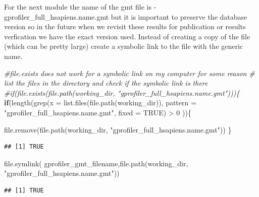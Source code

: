 \documentclass[
]{book}
\newenvironment{Shaded}{\begin{snugshade}}{\end{snugshade}}
\newcommand{\AttributeTok}[1]{\textcolor[rgb]{0.77,0.63,0.00}{#1}}
\newcommand{\CommentTok}[1]{\textcolor[rgb]{0.56,0.35,0.01}{\textit{#1}}}
\newcommand{\ConstantTok}[1]{\textcolor[rgb]{0.00,0.00,0.00}{#1}}
\newcommand{\ControlFlowTok}[1]{\textcolor[rgb]{0.13,0.29,0.53}{\textbf{#1}}}
\newcommand{\DecValTok}[1]{\textcolor[rgb]{0.00,0.00,0.81}{#1}}
\newcommand{\FunctionTok}[1]{\textcolor[rgb]{0.00,0.00,0.00}{#1}}
\newcommand{\NormalTok}[1]{#1}
\newcommand{\SpecialCharTok}[1]{\textcolor[rgb]{0.00,0.00,0.00}{#1}}
\newcommand{\StringTok}[1]{\textcolor[rgb]{0.31,0.60,0.02}{#1}}
\begin{document}
For the next module the name of the gmt file is - gprofiler\_full\_hsapiens.name.gmt but it is important to preserve the database version so in the future when we revisit these results for publication or results verfication we have the exact version used. Instead of creating a copy of the file (which can be pretty large) create a symbolic link to the file with the generic name.

\begin{Shaded}
\begin{Highlighting}[]
\CommentTok{\#file.exists does not work for a symbolic link on my computer for some reason}
\CommentTok{\# list the files in the directory and check if the symbolic link is there}
\CommentTok{\#if(file.exists(file.path(working\_dir, "gprofiler\_full\_hsapiens.name.gmt")))\{}
\ControlFlowTok{if}\NormalTok{(}\FunctionTok{length}\NormalTok{(}\FunctionTok{grep}\NormalTok{(}\AttributeTok{x =} \FunctionTok{list.files}\NormalTok{(}\FunctionTok{file.path}\NormalTok{(working\_dir)), }
              \AttributeTok{pattern =} \StringTok{"gprofiler\_full\_hsapiens.name.gmt"}\NormalTok{,}
              \AttributeTok{fixed =} \ConstantTok{TRUE}\NormalTok{) }\SpecialCharTok{\textgreater{}} \DecValTok{0}\NormalTok{ ))\{}

  \FunctionTok{file.remove}\NormalTok{(}\FunctionTok{file.path}\NormalTok{(working\_dir, }\StringTok{"gprofiler\_full\_hsapiens.name.gmt"}\NormalTok{))}
\NormalTok{\}}
\end{Highlighting}
\end{Shaded}

\begin{verbatim}
## [1] TRUE
\end{verbatim}

\begin{Shaded}
\begin{Highlighting}[]
\FunctionTok{file.symlink}\NormalTok{( gprofiler\_gmt\_filename,}\FunctionTok{file.path}\NormalTok{(working\_dir, }
                                   \StringTok{"gprofiler\_full\_hsapiens.name.gmt"}\NormalTok{))}
\end{Highlighting}
\end{Shaded}

\begin{verbatim}
## [1] TRUE
\end{verbatim}
\end{document}
